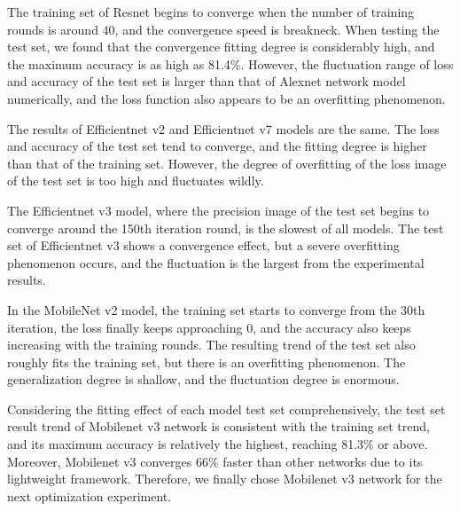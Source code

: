 \documentclass[a4paper,fleqn]{cas-sc}
\begin{document}
The training set of Resnet begins to converge when the number of training rounds is around 40, and the convergence speed is breakneck. When testing the test set, we found that the convergence fitting degree is considerably high, and the maximum accuracy is as high as 81.4\%. However, the fluctuation range of loss and accuracy of the test set is larger than that of Alexnet network model numerically, and the loss function also appears to be an overfitting phenomenon. 

The results of Efficientnet v2 and Efficientnet v7 models are the same. The loss and accuracy of the test set tend to converge, and the fitting degree is higher than that of the training set. However, the degree of overfitting of the loss image of the test set is too high and fluctuates wildly. 

The Efficientnet v3 model, where the precision image of the test set begins to converge around the 150th iteration round, is the slowest of all models. The test set of Efficientnet v3 shows a convergence effect, but a severe overfitting phenomenon occurs, and the fluctuation is the largest from the experimental results. 

In the MobileNet v2 model, the training set starts to converge from the 30th iteration, the loss finally keeps approaching 0, and the accuracy also keeps increasing with the training rounds. The resulting trend of the test set also roughly fits the training set, but there is an overfitting phenomenon. The generalization degree is shallow, and the fluctuation degree is enormous. 

Considering the fitting effect of each model test set comprehensively, the test set result trend of Mobilenet v3 network is consistent with the training set trend, and its maximum accuracy is relatively the highest, reaching 81.3\% or above. Moreover, Mobilenet v3 converges 66\% faster than other networks due to its lightweight framework. Therefore, we finally chose Mobilenet v3 network for the next optimization experiment.
\end{document}

